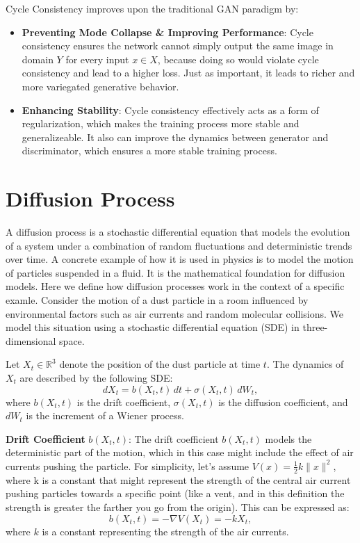 \documentclass[12pt]{article}
\begin{document}
Cycle Consistency improves upon the traditional GAN paradigm by: 
\begin{itemize}
\item\textbf{Preventing Mode Collapse \& Improving Performance}: Cycle consistency ensures the network cannot simply output the same image in domain \(Y\) for every input \(x \in X\), because doing so would violate cycle consistency and lead to a higher loss. Just as important, it leads to richer and more variegated generative behavior.
\item\textbf{Enhancing Stability}: Cycle consistency effectively acts as a form of regularization, which makes the training process more stable and generalizeable. It also can improve the dynamics between generator and discriminator, which ensures a more stable training process.
\end{itemize}
\section{Diffusion Process}
A diffusion process is a stochastic differential equation that models the evolution of a system under a combination of random fluctuations and deterministic trends over time. A concrete example of how it is used in physics is to model the motion of particles suspended in a fluid. It is the mathematical foundation for diffusion models. Here we define how diffusion processes work in the context of a specific examle. Consider the motion of a dust particle in a room influenced by environmental factors such as air currents and random molecular collisions. We model this situation using a stochastic differential equation (SDE) in three-dimensional space.

Let \(X_t \in \mathbb{R}^3\) denote the position of the dust particle at time \(t\). The dynamics of \(X_t\) are described by the following SDE:
\[
dX_t = b(X_t, t) \, dt + \sigma(X_t, t) \, dW_t,
\]
where \(b(X_t, t)\) is the drift coefficient, \(\sigma(X_t, t)\) is the diffusion coefficient, and \(dW_t\) is the increment of a Wiener process.

\textbf{Drift Coefficient} \(b(X_t, t)\):
The drift coefficient \(b(X_t, t)\) models the deterministic part of the motion, which in this case might include the effect of air currents pushing the particle. For simplicity, let's assume \(V(x) = \frac{1}{2}k \|x\|^2\), where k is a constant that might represent the strength of the central air current pushing particles towards a specific point (like a vent, and in this definition the strength is greater the farther you go from the origin). This can be expressed as:
\[
b(X_t, t) = -\nabla V(X_t) = -k X_t,
\]
where \(k\) is a constant representing the strength of the air currents.
\end{document}
